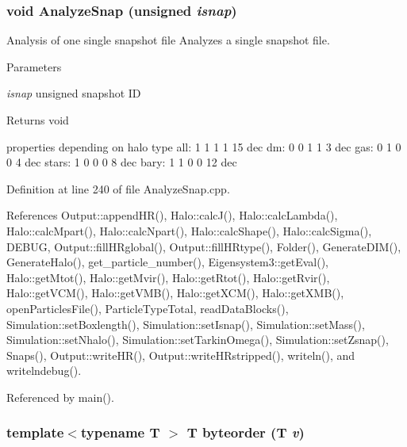 \subsubsection[{AnalyzeSnap}]{\setlength{\rightskip}{0pt plus 5cm}void AnalyzeSnap (unsigned {\em isnap})}\label{AnalyzeSnap_8cpp_adeb9f0fc17baa68b04ea3e4f96764400}


Analysis of one single snapshot file Analyzes a single snapshot file. 


\begin{DoxyParams}{Parameters}
\item[{\em isnap}]unsigned snapshot ID \end{DoxyParams}
\begin{DoxyReturn}{Returns}
void 
\end{DoxyReturn}


properties depending on halo type all: 1 1 1 1 15 dec dm: 0 0 1 1 3 dec gas: 0 1 0 0 4 dec stars: 1 0 0 0 8 dec bary: 1 1 0 0 12 dec



Definition at line 240 of file AnalyzeSnap.cpp.



References Output::appendHR(), Halo::calcJ(), Halo::calcLambda(), Halo::calcMpart(), Halo::calcNpart(), Halo::calcShape(), Halo::calcSigma(), DEBUG, Output::fillHRglobal(), Output::fillHRtype(), Folder(), GenerateDIM(), GenerateHalo(), get\_\-particle\_\-number(), Eigensystem3::getEval(), Halo::getMtot(), Halo::getMvir(), Halo::getRtot(), Halo::getRvir(), Halo::getVCM(), Halo::getVMB(), Halo::getXCM(), Halo::getXMB(), openParticlesFile(), ParticleTypeTotal, readDataBlocks(), Simulation::setBoxlength(), Simulation::setIsnap(), Simulation::setMass(), Simulation::setNhalo(), Simulation::setTarkinOmega(), Simulation::setZsnap(), Snaps(), Output::writeHR(), Output::writeHRstripped(), writeln(), and writelndebug().



Referenced by main().

\subsubsection[{byteorder}]{\setlength{\rightskip}{0pt plus 5cm}template$<$typename T $>$ T byteorder (T {\em v})}\label{AnalyzeSnap_8cpp_a5f4ec08ca17aee191961be83ac9d1e48}


